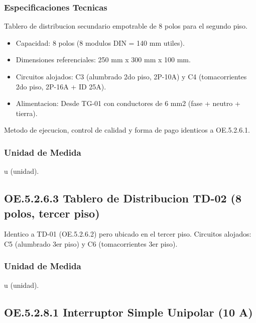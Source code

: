 \subsubsection{Especificaciones Tecnicas}

Tablero de distribucion secundario empotrable de 8 polos para el segundo piso.

\begin{itemize}[nosep]
  \item Capacidad: 8 polos (8 modulos DIN = 140 mm utiles).
  \item Dimensiones referenciales: 250 mm x 300 mm x 100 mm.
  \item Circuitos alojados: C3 (alumbrado 2do piso, 2P-10A) y C4 (tomacorrientes 2do piso, 2P-16A + ID 25A).
  \item Alimentacion: Desde TG-01 con conductores de 6 mm2 (fase + neutro + tierra).
\end{itemize}

Metodo de ejecucion, control de calidad y forma de pago identicos a OE.5.2.6.1.

\subsubsection{Unidad de Medida}

u (unidad).

\subsection{OE.5.2.6.3 Tablero de Distribucion TD-02 (8 polos, tercer piso)}

Identico a TD-01 (OE.5.2.6.2) pero ubicado en el tercer piso. Circuitos alojados: C5 (alumbrado 3er piso) y C6 (tomacorrientes 3er piso).

\subsubsection{Unidad de Medida}

u (unidad).

\subsection{OE.5.2.8.1 Interruptor Simple Unipolar (10 A)}

